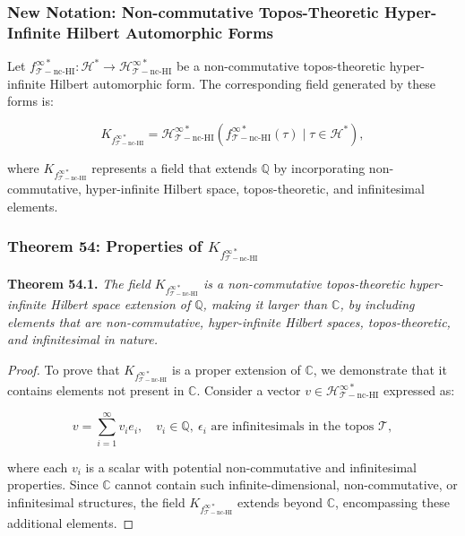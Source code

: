 \documentclass{article}
\begin{document}
\subsubsection{New Notation: Non-commutative Topos-Theoretic Hyper-Infinite Hilbert Automorphic Forms}
Let \(f_{\mathcal{T}-\text{nc-HI}}^{\infty *}: \mathcal{H}^* \to \mathcal{H}_{\mathcal{T}-\text{nc-HI}}^{\infty *}\) be a non-commutative topos-theoretic hyper-infinite Hilbert automorphic form. The corresponding field generated by these forms is:

\[
K_{f_{\mathcal{T}-\text{nc-HI}}^{\infty *}} = \mathcal{H}_{\mathcal{T}-\text{nc-HI}}^{\infty *}(f_{\mathcal{T}-\text{nc-HI}}^{\infty *}(\tau) \mid \tau \in \mathcal{H}^*),
\]

where \(K_{f_{\mathcal{T}-\text{nc-HI}}^{\infty *}}\) represents a field that extends \(\mathbb{Q}\) by incorporating non-commutative, hyper-infinite Hilbert space, topos-theoretic, and infinitesimal elements.

\subsubsection{Theorem 54: Properties of \(K_{f_{\mathcal{T}-\text{nc-HI}}^{\infty *}}\)}
\textbf{Theorem 54.1.} \textit{The field \(K_{f_{\mathcal{T}-\text{nc-HI}}^{\infty *}}\) is a non-commutative topos-theoretic hyper-infinite Hilbert space extension of \(\mathbb{Q}\), making it larger than \(\mathbb{C}\), by including elements that are non-commutative, hyper-infinite Hilbert spaces, topos-theoretic, and infinitesimal in nature.}

\begin{proof}
To prove that \(K_{f_{\mathcal{T}-\text{nc-HI}}^{\infty *}}\) is a proper extension of \(\mathbb{C}\), we demonstrate that it contains elements not present in \(\mathbb{C}\). Consider a vector \(v \in \mathcal{H}_{\mathcal{T}-\text{nc-HI}}^{\infty *}\) expressed as:

\[
v = \sum_{i=1}^{\infty} v_i e_i, \quad v_i \in \mathbb{Q}, \ \epsilon_i \text{ are infinitesimals in the topos } \mathcal{T}, 
\]

where each \(v_i\) is a scalar with potential non-commutative and infinitesimal properties. Since \(\mathbb{C}\) cannot contain such infinite-dimensional, non-commutative, or infinitesimal structures, the field \(K_{f_{\mathcal{T}-\text{nc-HI}}^{\infty *}}\) extends beyond \(\mathbb{C}\), encompassing these additional elements.
\end{proof}
\end{document}
